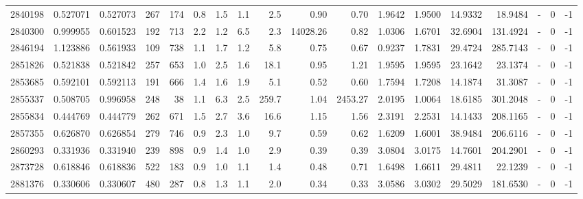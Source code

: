 \begin{tabular}{rrrrrrrrrrrrrrrlrr}
   2840198 & 0.527071 &   0.527073 &  267 &  174 &      0.8 &      1.5 &     1.1 &      2.5 &       0.90 &        0.70 &  1.9642 &  1.9500 &   14.9332 &   18.9484 &             - &        0 &         -1 \\
   2840300 & 0.999955 &   0.601523 &  192 &  713 &      2.2 &      1.2 &     6.5 &      2.3 &   14028.26 &        0.82 &  1.0306 &  1.6701 &   32.6904 &  131.4924 &             - &        0 &         -1 \\
   2846194 & 1.123886 &   0.561933 &  109 &  738 &      1.1 &      1.7 &     1.2 &      5.8 &       0.75 &        0.67 &  0.9237 &  1.7831 &   29.4724 &  285.7143 &             - &        0 &         -1 \\
   2851826 & 0.521838 &   0.521842 &  257 &  653 &      1.0 &      2.5 &     1.6 &     18.1 &       0.95 &        1.21 &  1.9595 &  1.9595 &   23.1642 &   23.1374 &             - &        0 &         -1 \\
   2853685 & 0.592101 &   0.592113 &  191 &  666 &      1.4 &      1.6 &     1.9 &      5.1 &       0.52 &        0.60 &  1.7594 &  1.7208 &   14.1874 &   31.3087 &             - &        0 &         -1 \\
   2855337 & 0.508705 &   0.996958 &  248 &   38 &      1.1 &      6.3 &     2.5 &    259.7 &       1.04 &     2453.27 &  2.0195 &  1.0064 &   18.6185 &  301.2048 &             - &        0 &         -1 \\
   2855834 & 0.444769 &   0.444779 &  262 &  671 &      1.5 &      2.7 &     3.6 &     16.6 &       1.15 &        1.56 &  2.3191 &  2.2531 &   14.1433 &  208.1165 &             - &        0 &         -1 \\
   2857355 & 0.626870 &   0.626854 &  279 &  746 &      0.9 &      2.3 &     1.0 &      9.7 &       0.59 &        0.62 &  1.6209 &  1.6001 &   38.9484 &  206.6116 &             - &        0 &         -1 \\
   2860293 & 0.331936 &   0.331940 &  239 &  898 &      0.9 &      1.4 &     1.0 &      2.9 &       0.39 &        0.39 &  3.0804 &  3.0175 &   14.7601 &  204.2901 &             - &        0 &         -1 \\
   2873728 & 0.618846 &   0.618836 &  522 &  183 &      0.9 &      1.0 &     1.1 &      1.4 &       0.48 &        0.71 &  1.6498 &  1.6611 &   29.4811 &   22.1239 &             - &        0 &         -1 \\
   2881376 & 0.330606 &   0.330607 &  480 &  287 &      0.8 &      1.3 &     1.1 &      2.0 &       0.34 &        0.33 &  3.0586 &  3.0302 &   29.5029 &  181.6530 &             - &        0 &         -1 \\

\end{tabular}
